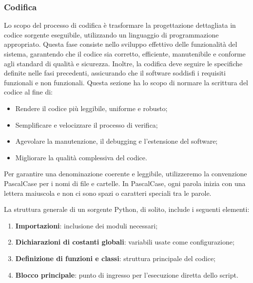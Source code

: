 \subsubsection{Codifica}
Lo scopo del processo di codifica è trasformare la progettazione dettagliata in codice sorgente eseguibile, utilizzando un linguaggio di programmazione appropriato. Questa fase consiste nello sviluppo effettivo delle funzionalità del sistema, garantendo che il codice sia corretto, efficiente, manutenibile e conforme agli standard di qualità e sicurezza. Inoltre, la codifica deve seguire le specifiche definite nelle fasi precedenti, assicurando che il software soddisfi i requisiti funzionali e non funzionali. Questa sezione ha lo scopo di normare la scrittura del codice al fine di:
\begin{itemize}
    \item Rendere il codice più leggibile, uniforme e robusto;
    \item Semplificare e velocizzare il processo di verifica;
    \item Agevolare la manutenzione, il debugging e l'estensione del software;
    \item Migliorare la qualità complessiva del codice.
\end{itemize}

Per garantire una denominazione coerente e leggibile, utilizzeremo la convenzione PascalCase per i nomi di file e cartelle. In PascalCase, ogni parola inizia con una lettera maiuscola e non ci sono spazi o caratteri speciali tra le parole.

La struttura generale di un sorgente Python, di solito, include i seguenti elementi:
\begin{enumerate}
    \item \textbf{Importazioni}: inclusione dei moduli necessari;
    \item \textbf{Dichiarazioni di costanti globali}: variabili usate come configurazione;
    \item \textbf{Definizione di funzioni e classi}: struttura principale del codice;
    \item \textbf{Blocco principale}: punto di ingresso per l'esecuzione diretta dello script.
\end{enumerate}


